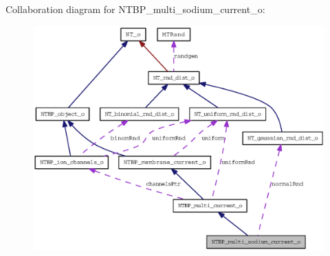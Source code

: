 Collaboration diagram for NTBP\_\-multi\_\-sodium\_\-current\_\-o:
\nopagebreak
\begin{figure}[H]
\begin{center}
\leavevmode
\includegraphics[width=400pt]{class_n_t_b_p__multi__sodium__current__o__coll__graph}
\end{center}
\end{figure}
